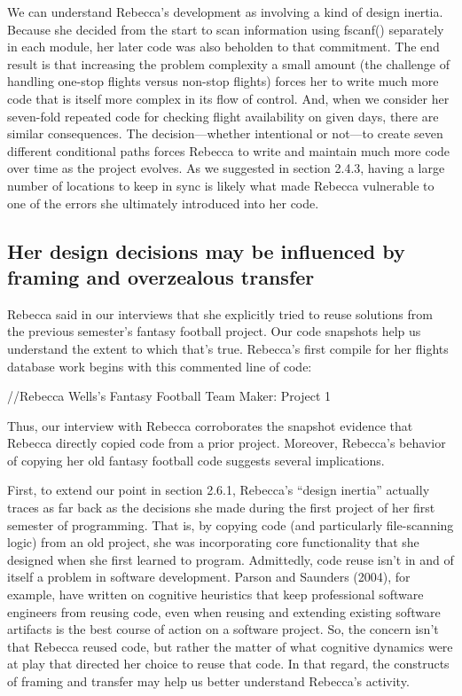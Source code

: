 We can understand Rebecca's development as involving a kind of design inertia. Because she decided from the start to scan information using fscanf() separately in each module, her later code was also beholden to that commitment. The end result is that increasing the problem complexity a small amount (the challenge of handling one-stop flights versus non-stop flights) forces her to write much more code that is itself more complex in its flow of control. And, when we consider her seven-fold repeated code for checking flight availability on given days, there are similar consequences. The decision---whether intentional or not---to create seven different conditional paths forces Rebecca to write and maintain much more code over time as the project evolves. As we suggested in section 2.4.3, having a large number of locations to keep in sync is likely what made Rebecca vulnerable to one of the errors she ultimately introduced into her code.

\subsection{Her design decisions may be influenced by framing and overzealous transfer}\label{her-design-decisions-may-be-influenced-by-framing-and-overzealous-transfer}

Rebecca said in our interviews that she explicitly tried to reuse solutions from the previous semester's fantasy football project. Our code snapshots help us understand the extent to which that's true. Rebecca's first compile for her flights database work begins with this commented line of code:

//Rebecca Wells's Fantasy Football Team Maker: Project 1

Thus, our interview with Rebecca corroborates the snapshot evidence that Rebecca directly copied code from a prior project. Moreover, Rebecca's behavior of copying her old fantasy football code suggests several implications.

First, to extend our point in section 2.6.1, Rebecca's ``design inertia'' actually traces as far back as the decisions she made during the first project of her first semester of programming. That is, by copying code (and particularly file-scanning logic) from an old project, she was incorporating core functionality that she designed when she first learned to program. Admittedly, code reuse isn't in and of itself a problem in software development. Parson and Saunders (2004), for example, have written on cognitive heuristics that keep professional software engineers from reusing code, even when reusing and extending existing software artifacts is the best course of action on a software project. So, the concern isn't that Rebecca reused code, but rather the matter of what cognitive dynamics were at play that directed her choice to reuse that code. In that regard, the constructs of framing and transfer may help us better understand Rebecca's activity.

